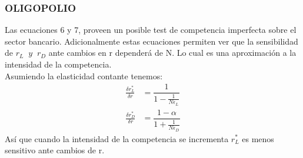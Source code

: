 \begin{frame}
    \frametitle{{\normalsize OLIGOPOLIO} {}}
    Las ecuaciones 6 y 7, proveen un posible test de competencia imperfecta sobre el sector bancario. Adicionalmente estas ecuaciones permiten ver que la sensibilidad de $r_{L}\; \; y \; \; r_{D}$ ante cambios en r dependerá de N. Lo cual es una aproximación a la intensidad de la competencia.\\
    Asumiendo la elasticidad contante tenemos:
 \begin{align}
 \frac{\delta r_{L}^{*}}{\delta r}&= \dfrac{1}{1-\frac{1}{N \epsilon_{L}}}\nonumber \\
 \frac{\delta r_{D}^{*}}{\delta r} &=\dfrac{1-\alpha}{1+\frac{1}{N \epsilon_{D}}}\nonumber 
 \end{align} 
   Así que cuando la intensidad de la competencia se incrementa $r_{L}^{*}$ es menos sensitivo ante cambios de r.
\end{frame}
